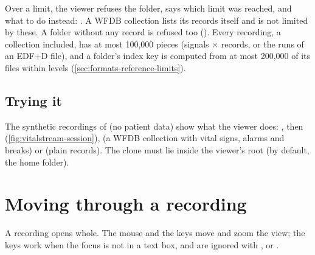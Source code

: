 Over a limit, the viewer refuses the folder, says which limit was reached, and what to do
instead: . A WFDB collection lists its records itself and is not limited by
these. A folder without any record is refused too ().
Every recording, a collection included, has at most 100,000 pieces (signals $\times$ records,
or the runs of an EDF+D file), and a folder's index key is computed from at most 200,000 of its
files within  levels (\cref{sec:formats-reference-limits}).

\subsection{Trying it}
\label{sec:vitalstream-try}

The synthetic recordings of  (no patient data) show what the
viewer does: , then 
(\cref{fig:vitalstream-session}),  (a WFDB collection with vital signs,
alarms and breaks) or  (plain records). The clone must lie inside the viewer's
root (by default, the home folder).

\section{Moving through a recording}
\label{sec:vitalstream-navigate}

A recording opens whole. The mouse and the keys move and zoom the view; the keys work when the
focus is not in a text box, and are ignored with ,  or .

